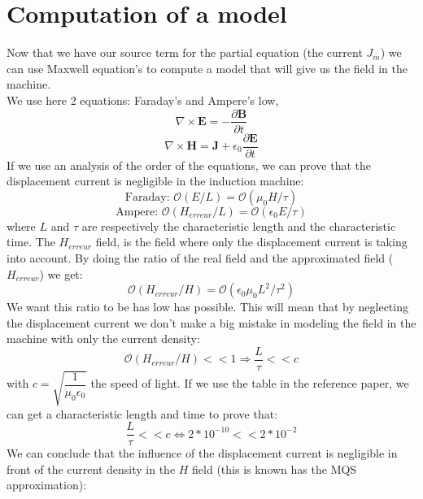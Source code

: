 \section{Computation of a model}
Now that we have our source term for the partial equation (the current $J_{m}$) we can use Maxwell equation's to compute a model that will give us the field in the machine.
\\
We use here 2 equations: Faraday's and Ampere's low,
\begin{equation}
    \nabla \times \textbf{E} = -\dfrac{\partial \textbf{B}}{\partial t}
\end{equation}
\begin{equation}
    \nabla \times \textbf{H} = \textbf{J} +\epsilon_{0}\dfrac{\partial \textbf{E}}{\partial t}
\end{equation}
If we use an analysis of the order of the equations, we can prove that the displacement current is negligible in the induction machine: 
\begin{equation}
    \text{Faraday: }\mathcal{O}(E/L) = \mathcal{O}(\mu_{0}H/\tau)
\end{equation}
\begin{equation}
    \text{Ampere: }\mathcal{O}(H_{erreur}/L) = \mathcal{O}(\epsilon_{0}E/\tau)
\end{equation}
where $L$ and $\tau$ are respectively the characteristic length and the characteristic time. The $H_{erreur}$ field, is the field where only the displacement current is taking into account. 
By doing the ratio of the real field and the approximated field ($H_{erreur}$) we get:
\begin{equation}
    \mathcal{O}(H_{erreur}/H) = \mathcal{O}(\epsilon_{0}\mu_{0}L^{2}/\tau^{2}) 
\end{equation}
We want this ratio to be has low has possible. This will mean that by neglecting the displacement current we don't make a big mistake in modeling the field in the machine with only the current density:
\begin{equation}
    \mathcal{O}(H_{erreur}/H)<<1 \Rightarrow \dfrac{L}{\tau}<< c
\end{equation}
with $c = \sqrt{\dfrac{1}{\mu_{0}\epsilon_{0}}}$ the speed of light. If we use the table in the reference paper, we can get a characteristic length and time to prove that:
\begin{equation}
    \dfrac{L}{\tau}<< c \Longleftrightarrow 2*10^{-10}<<2*10^{-2}
\end{equation}
We can conclude that the influence of the displacement current is negligible in front of the current density in the $H$ field (this is known has the MQS approximation):
